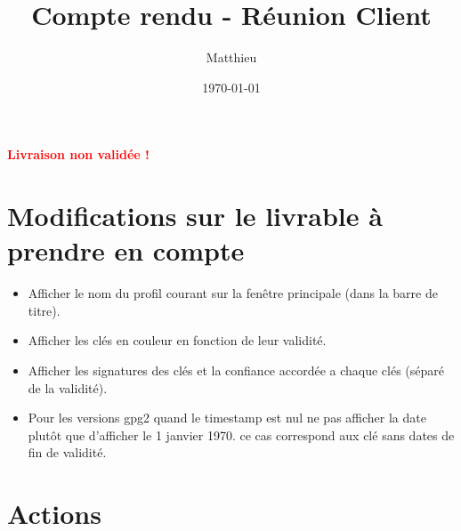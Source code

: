 \documentclass{CR-projet}
\title{Compte rendu - Réunion Client}
\author{Matthieu \bsc{FIN}}
\date{\today}
\begin{document}
\maketitle
\newpage

\newpage

\textbf{\Large \textcolor{red} {Livraison non validée !}}


\section{Modifications sur le livrable à prendre en compte}

\begin{itemize}
	\item Afficher le nom du profil courant sur la fenêtre principale (dans la barre de titre).
	\item Afficher les clés en couleur en fonction de leur validité.
	\item Afficher les signatures des clés et la confiance accordée a chaque clés (séparé de la validité).
	\item Pour les versions gpg2 quand le timestamp est nul ne pas afficher la date plutôt que d'afficher le 1 janvier 1970.
	ce cas correspond aux clé sans dates de fin de validité.
\end{itemize}

\section{Actions}
\end{document}
